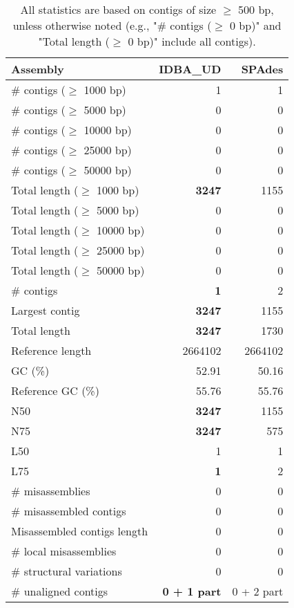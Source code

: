\documentclass[12pt,a4paper]{article}
\begin{document}
\begin{table}[ht]
\begin{center}
\caption{All statistics are based on contigs of size $\geq$ 500 bp, unless otherwise noted (e.g., "\# contigs ($\geq$ 0 bp)" and "Total length ($\geq$ 0 bp)" include all contigs).}
\begin{tabular}{|l*{2}{|r}|}
\hline
Assembly & IDBA\_UD & SPAdes \\ \hline
\# contigs ($\geq$ 1000 bp) & 1 & 1 \\ \hline
\# contigs ($\geq$ 5000 bp) & 0 & 0 \\ \hline
\# contigs ($\geq$ 10000 bp) & 0 & 0 \\ \hline
\# contigs ($\geq$ 25000 bp) & 0 & 0 \\ \hline
\# contigs ($\geq$ 50000 bp) & 0 & 0 \\ \hline
Total length ($\geq$ 1000 bp) & {\bf 3247} & 1155 \\ \hline
Total length ($\geq$ 5000 bp) & 0 & 0 \\ \hline
Total length ($\geq$ 10000 bp) & 0 & 0 \\ \hline
Total length ($\geq$ 25000 bp) & 0 & 0 \\ \hline
Total length ($\geq$ 50000 bp) & 0 & 0 \\ \hline
\# contigs & {\bf 1} & 2 \\ \hline
Largest contig & {\bf 3247} & 1155 \\ \hline
Total length & {\bf 3247} & 1730 \\ \hline
Reference length & 2664102 & 2664102 \\ \hline
GC (\%) & 52.91 & 50.16 \\ \hline
Reference GC (\%) & 55.76 & 55.76 \\ \hline
N50 & {\bf 3247} & 1155 \\ \hline
N75 & {\bf 3247} & 575 \\ \hline
L50 & 1 & 1 \\ \hline
L75 & {\bf 1} & 2 \\ \hline
\# misassemblies & 0 & 0 \\ \hline
\# misassembled contigs & 0 & 0 \\ \hline
Misassembled contigs length & 0 & 0 \\ \hline
\# local misassemblies & 0 & 0 \\ \hline
\# structural variations & 0 & 0 \\ \hline
\# unaligned contigs & {\bf 0 + 1 part} & 0 + 2 part \\ \hline

\end{tabular}
\end{center}
\end{table}
\end{document}

